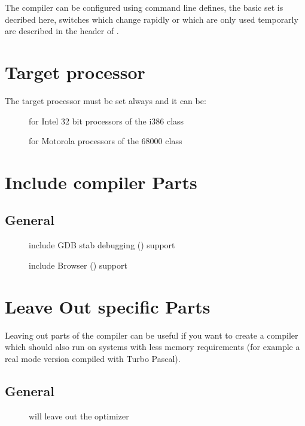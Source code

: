 The compiler can be configured using command line defines, the
basic set is decribed here, switches which change rapidly or
which are only used temporarly are described in the header
of .

\section{Target processor}

The target processor must be set always and it can be:

\begin{description}
\item [] for Intel 32 bit processors of the i386 class
\item [] for Motorola processors of the 68000 class
\end{description}

\section{Include compiler Parts}

\subsection{General}
\begin{description}
 \item[] include GDB stab debugging () support
 \item[] include Browser () support
\end{description}

\section{Leave Out specific Parts}

Leaving out parts of the compiler can be useful if you want to create
a compiler which should also run on systems with less memory
requirements (for example a real mode version compiled with Turbo Pascal).

\subsection{General}
\begin{description}
 \item[] will leave out the optimizer
\end{description}

